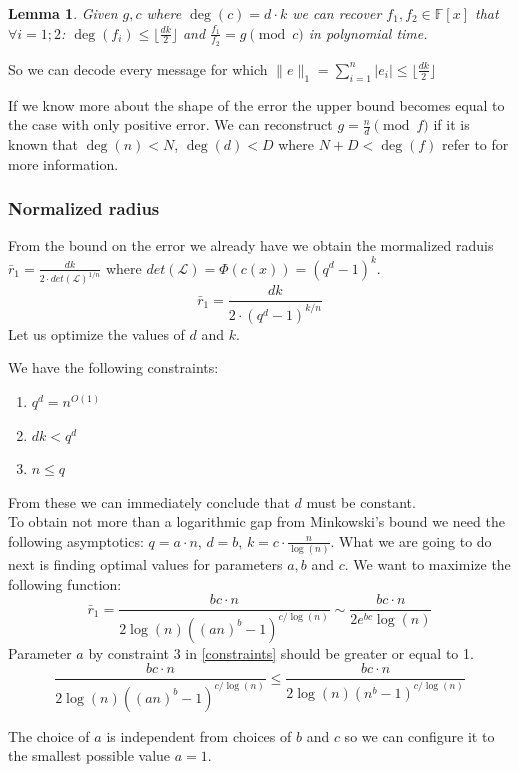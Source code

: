 \documentclass[12pt]{article}
\newcommand{\floor}[1]{\lfloor #1 \rfloor}
\newtheorem{lemma}{Lemma}
\begin{document}
\begin{lemma}
Given $g,c$ where $\deg(c) = d \cdot k$ we can recover $f_{1}, f_{2} \in \mathbb{F}[x]$ that  $\forall i = 1;2$: $\deg(f_{i}) \leq \floor{\frac{dk}{2}}$ and $\frac{f_{1}}{f_{2}} = g \pmod{c}$ in polynomial time.
\end{lemma}

So we can decode every message for which $\|e\|_1 = \sum_{i =1}^{n} |e_i| \leq \floor{\frac{dk}{2}}$

If we know more about the shape of the error the upper bound becomes equal to the case with only positive error. We can reconstruct $g = \frac{n}{d} \pmod{f}$ if it is known that $\deg(n) < N$, $\deg(d) < D$ where $N + D < \deg(f)$ refer to \cite{[KM06]} for more information.


\subsubsection{Normalized radius}
\label{subsubsec:normalized_discrete_error}
From the bound on the error we already have we obtain the mormalized raduis $\bar{r}_1 = \frac{dk}{2 \cdot det(\mathcal{L})^{1/n}}$ where $det(\mathcal{L}) = \Phi(c(x)) = (q^{d} - 1)^{k}$.
\[
\bar{r}_1 = \frac{dk}{2 \cdot (q^{d} - 1)^{k/n}}
\]
Let us optimize the values of $d$ and $k$.

We have the following constraints:
\begin{enumerate}\label{constraints}
    \item $q^d = n^{O(1)}$
    \item $dk < q^{d}$
    \item $n \leq q$
\end{enumerate}
From these we can immediately conclude that $d$ must be constant. \\

To obtain not more than a logarithmic gap from Minkowski's bound we need the following asymptotics: $q = a \cdot n$, $d = b$, $k =  c \cdot \frac{n}{\log(n)}$. What we are going to do next is finding optimal values for parameters $a, b$ and $c$. We want to maximize the following function:
\[
\bar{r}_1 = \frac{bc \cdot n}{2\log(n)((an)^{b} - 1)^{c/\log(n)}}  \sim \frac{bc \cdot n}{2e^{bc}\log(n)}
\]
 Parameter $a$ by constraint 3 in \ref{constraints} should be greater or equal to 1.
 \[
    \frac{bc \cdot n}{2\log(n)((an)^{b} - 1)^{c/\log(n)}} \leq \frac{bc \cdot n}{2\log(n)(n^{b} - 1)^{c/\log(n)}}
 \]

The choice of $a$ is independent from choices of $b$ and $c$ so we can configure it to the smallest possible value $a = 1$.
\end{document}
